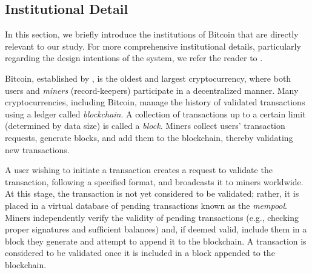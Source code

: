 \documentclass[12pt, letterpaper]{article}
\begin{document}
\subsection{Institutional Detail}

In this section, we briefly introduce the institutions of Bitcoin that are directly relevant to our study. For more comprehensive institutional details, particularly regarding the design intentions of the system, we refer the reader to \citet{narayanan2016bitcoin}.

Bitcoin, established by \citet{nakamoto2008bitcoin}, is the oldest and largest cryptocurrency, where both users and \emph{miners} (record-keepers) participate in a decentralized manner. Many cryptocurrencies, including Bitcoin, manage the history of validated transactions using a ledger called \emph{blockchain}. A collection of transactions up to a certain limit (determined by data size) is called a \emph{block}. Miners collect users' transaction requests, generate blocks, and add them to the blockchain, thereby validating new transactions.

A user wishing to initiate a transaction creates a request to validate the transaction, following a specified format, and broadcasts it to miners worldwide. At this stage, the transaction is not yet considered to be validated; rather, it is placed in a virtual database of pending transactions known as the \emph{mempool}. Miners independently verify the validity of pending transactions (e.g., checking proper signatures and sufficient balances) and, if deemed valid, include them in a block they generate and attempt to append it to the blockchain. A transaction is considered to be validated once it is included in a block appended to the blockchain.
\end{document}
